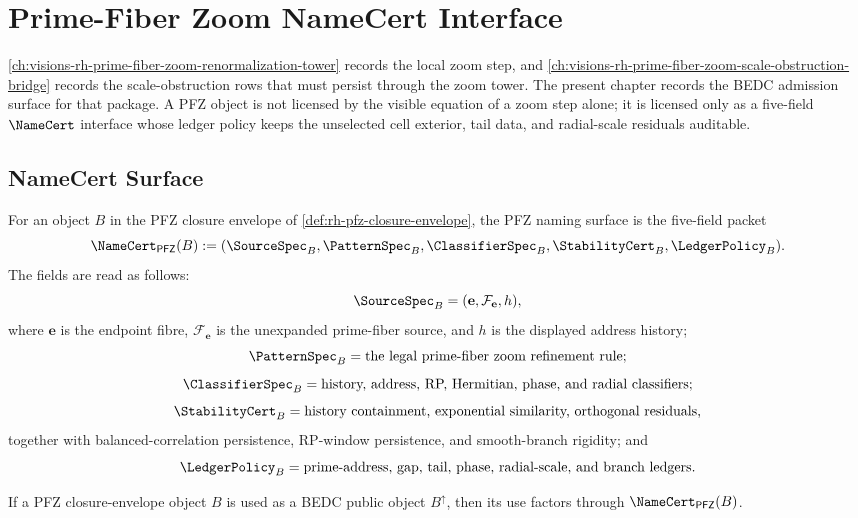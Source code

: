 \chapter{Prime-Fiber Zoom NameCert Interface}
\label{ch:visions-rh-prime-fiber-zoom-namecert-interface}

\autoref{ch:visions-rh-prime-fiber-zoom-renormalization-tower} records the
local zoom step, and
\autoref{ch:visions-rh-prime-fiber-zoom-scale-obstruction-bridge} records the
scale-obstruction rows that must persist through the zoom tower.  The present
chapter records the BEDC admission surface for that package.  A PFZ object is
not licensed by the visible equation of a zoom step alone; it is licensed only
as a five-field $\NameCert$ interface whose ledger policy keeps the unselected
cell exterior, tail data, and radial-scale residuals auditable.

\section{NameCert Surface}
\label{sec:rh-pfz-namecert-surface}

\begin{definition}
\label{def:rh-pfz-namecert-surface}
For an object $B$ in the PFZ closure envelope of
\autoref{def:rh-pfz-closure-envelope}, the PFZ naming surface is the
five-field packet
$$
\NameCert_{\mathsf{PFZ}}(B)
:=
(\SourceSpec_B,\PatternSpec_B,\ClassifierSpec_B,\StabilityCert_B,\LedgerPolicy_B).
$$
The fields are read as follows:
$$
\SourceSpec_B
=
(\mathbf e,\mathcal F_{\mathbf e},h),
$$
where $\mathbf e$ is the endpoint fibre, $\mathcal F_{\mathbf e}$ is the
unexpanded prime-fiber source, and $h$ is the displayed address history;
$$
\PatternSpec_B
=
\text{the legal prime-fiber zoom refinement rule};
$$
$$
\ClassifierSpec_B
=
\text{history, address, RP, Hermitian, phase, and radial classifiers};
$$
$$
\StabilityCert_B
=
\text{history containment, exponential similarity, orthogonal residuals,}
$$
together with balanced-correlation persistence, RP-window persistence, and
smooth-branch rigidity; and
$$
\LedgerPolicy_B
=
\text{prime-address, gap, tail, phase, radial-scale, and branch ledgers}.
$$
\end{definition}

\begin{theorem}
\label{thm:rh-pfz-objects-enter-bedc-through-namecert}
If a PFZ closure-envelope object $B$ is used as a BEDC public object
$B^{\uparrow}$, then its use factors through
$\NameCert_{\mathsf{PFZ}}(B)$.
\end{theorem}

